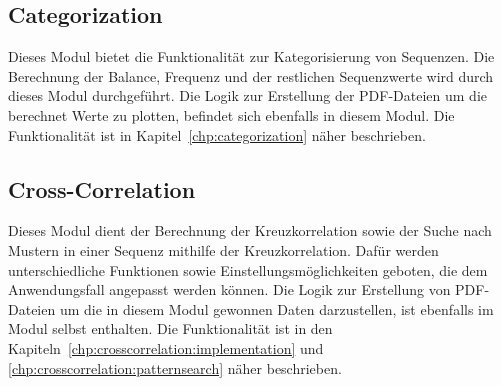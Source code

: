 \subsection{Categorization}
Dieses Modul bietet die Funktionalität zur Kategorisierung von Sequenzen.
Die Berechnung der Balance, Frequenz und der restlichen Sequenzwerte wird durch dieses Modul durchgeführt.
Die Logik zur Erstellung der PDF-Dateien um die berechnet Werte zu plotten, befindet sich ebenfalls in diesem Modul.
Die Funktionalität ist in Kapitel~\ref{chp:categorization} näher beschrieben.

\subsection{Cross-Correlation}
Dieses Modul dient der Berechnung der Kreuzkorrelation sowie der Suche nach Mustern in einer Sequenz mithilfe der Kreuzkorrelation.
Dafür werden unterschiedliche Funktionen sowie Einstellungsmöglichkeiten geboten, die dem Anwendungsfall angepasst werden können.
Die Logik zur Erstellung von PDF-Dateien um die in diesem Modul gewonnen Daten darzustellen, ist ebenfalls im Modul selbst enthalten.
Die Funktionalität ist in den Kapiteln~\ref{chp:crosscorrelation:implementation} und \ref{chp:crosscorrelation:patternsearch} näher beschrieben.
